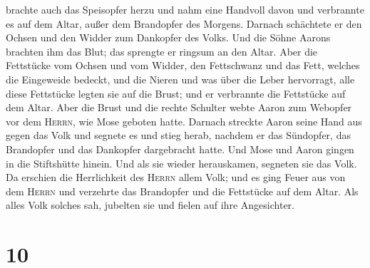 brachte auch das Speisopfer herzu und nahm eine Handvoll davon und
verbrannte es auf dem Altar, außer dem Brandopfer des Morgens.
 Darnach schächtete er den Ochsen und den Widder zum
Dankopfer des Volks. Und die Söhne Aarons brachten ihm das Blut; das
sprengte er ringsum an den Altar.  Aber die Fettstücke
vom Ochsen und vom Widder, den Fettschwanz und das Fett, welches die
Eingeweide bedeckt, und die Nieren und was über die Leber hervorragt,
 alle diese Fettstücke legten sie auf die Brust; und er
verbrannte die Fettstücke auf dem Altar.  Aber die Brust
und die rechte Schulter webte Aaron zum Webopfer vor dem \textsc{Herrn},
wie Mose geboten hatte.  Darnach streckte Aaron seine
Hand aus gegen das Volk und segnete es und stieg herab, nachdem er das
Sündopfer, das Brandopfer und das Dankopfer dargebracht hatte.
 Und Mose und Aaron gingen in die Stiftshütte hinein. Und
als sie wieder herauskamen, segneten sie das Volk. Da erschien die
Herrlichkeit des \textsc{Herrn} allem Volk;  und es ging
Feuer aus von dem \textsc{Herrn} und verzehrte das Brandopfer und die
Fettstücke auf dem Altar. Als alles Volk solches sah, jubelten sie und
fielen auf ihre Angesichter.

\hypertarget{section-9}{%
\section{10}\label{section-9}}

